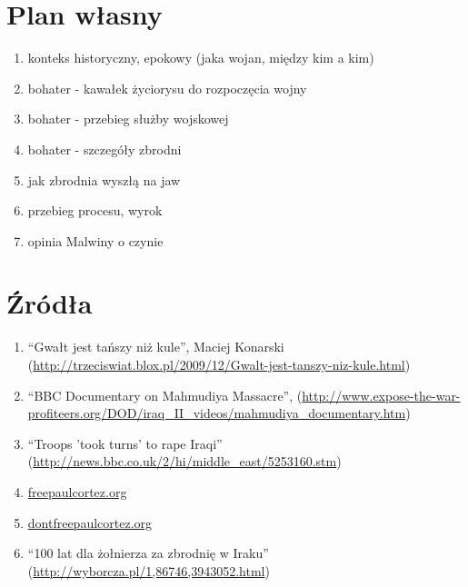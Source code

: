 \documentclass[12pt,a4paper]{article}
\begin{document}
\section{Plan własny}

\begin{enumerate}
\item konteks historyczny, epokowy (jaka wojan, między kim a kim)
\item bohater - kawałek życiorysu do rozpoczęcia wojny
\item bohater - przebieg służby wojskowej
\item bohater - szczegóły zbrodni
\item jak zbrodnia wyszłą na jaw
\item przebieg procesu, wyrok
\item opinia Malwiny o czynie
\end{enumerate}

\section{Źródła}

\begin{enumerate}
\item ``Gwałt jest tańszy niż kule'', Maciej Konarski (\url{http://trzeciswiat.blox.pl/2009/12/Gwalt-jest-tanszy-niz-kule.html})
\item ``BBC Documentary on Mahmudiya Massacre'',
  (\url{http://www.expose-the-war-profiteers.org/DOD/iraq_II_videos/mahmudiya_documentary.htm})
\item ``Troops 'took turns' to rape Iraqi'' (\url{http://news.bbc.co.uk/2/hi/middle_east/5253160.stm})
\item \url{freepaulcortez.org}
\item \url{dontfreepaulcortez.org}
\item ``100 lat dla żołnierza za zbrodnię w Iraku'' (\url{http://wyborcza.pl/1,86746,3943052.html})
\end{enumerate}
\end{document}
